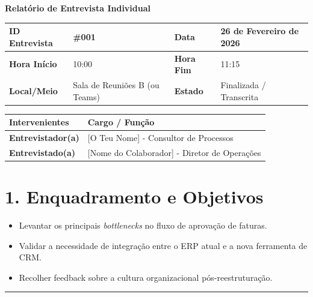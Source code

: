 \documentclass[11pt,a4paper]{article}
\begin{document}
	
	{\noindent\LARGE\bfseries\color{primaryblue} Relatório de Entrevista Individual}
	\\[0.5cm]
	
	\renewcommand{\arraystretch}{1.5}
	\begin{tabularx}{\textwidth}{@{}|l|X|l|X|@{}}
		\hline
		\rowcolor{gray!10} \textbf{ID Entrevista} & \#001 & \textbf{Data} & 26 de Fevereiro de 2026 \\ \hline
		\textbf{Hora Início} & 10:00 & \textbf{Hora Fim} & 11:15 \\ \hline
		\textbf{Local/Meio} & Sala de Reuniões B (ou Teams) & \textbf{Estado} & Finalizada / Transcrita \\ \hline
	\end{tabularx}
	
	\vspace{0.5cm}
	
	\begin{tabularx}{\textwidth}{@{}|l|X|@{}}
		\hline
		\rowcolor{gray!10} \textbf{Intervenientes} & \textbf{Cargo / Função} \\ \hline
		\textbf{Entrevistador(a)} & [O Teu Nome] - Consultor de Processos \\ \hline
		\textbf{Entrevistado(a)}  & [Nome do Colaborador] - Diretor de Operações \\ \hline
	\end{tabularx}
	
	\vspace{0.8cm}
	
	\section*{1. Enquadramento e Objetivos}
	\begin{itemize}[leftmargin=*, label=\small\color{primaryblue}$\blacksquare$]
		\item Levantar os principais \textit{bottlenecks} no fluxo de aprovação de faturas.
		\item Validar a necessidade de integração entre o ERP atual e a nova ferramenta de CRM.
		\item Recolher feedback sobre a cultura organizacional pós-reestruturação.
	\end{itemize}
	
	\hrule %
	\vspace{0.5cm}
	
\end{document}
